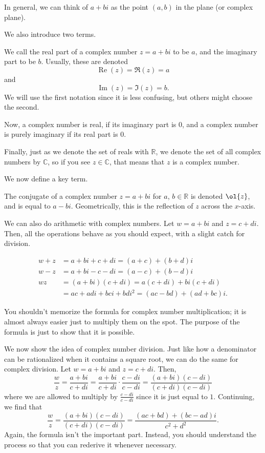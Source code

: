 \documentclass[11pt]{scrartcl}
\begin{document}
In general, we can think of $a+bi$ as the point $(a,b)$ in the plane (or complex plane).

We also introduce two terms.

\begin{definition*}
We call the real part of a complex number $z = a+bi$ to be $a$, and the imaginary part to be $b$. Usually, these are denoted \[\operatorname{Re}(z) = \Re(z) = a\] and \[\operatorname{Im}(z) = \Im(z) = b.\] We will use the first notation since it is less confusing, but others might choose the second.
\end{definition*}

Now, a complex number is real, if its imaginary part is $0$, and a complex number is purely imaginary if its real part is $0$.

Finally, just as we denote the set of reals with $\mathbb{R}$, we denote the set of all complex numbers by $\mathbb{C}$, so if you see $z \in \mathbb{C}$, that means that $z$ is a complex number.

We now define a key term.

\begin{definition*}
The conjugate of a complex number $z = a+bi$ for $a$, $b \in \mathbb{R}$ is denoted $\ol{z}$, and is equal to $a-bi$. Geometrically, this is the reflection of $z$ across the $x$-axis.
\end{definition*}

We can also do arithmetic with complex numbers. Let $w = a+bi$ and $z = c+di$. Then, all the operations behave as you should expect, with a slight catch for division.

\begin{align*}
w+z &= a+bi+c+di = (a+c)+(b+d)i \\
w-z &= a+bi-c-di = (a-c)+(b-d)i \\
wz &= (a+bi)(c+di) = a(c+di)+bi(c+di) \\
&= ac+adi+bci+bdi^2 = (ac-bd) +(ad+bc) i.
\end{align*}

You shouldn't memorize the formula for complex number multiplication; it is almost always easier just to multiply them on the spot. The purpose of the formula is just to show that it is possible.

We now show the idea of complex number division. Just like how a denominator can be rationalized when it contains a square root, we can do the same for complex division. Let $w = a+bi$ and $z = c+di$. Then, \[\dfrac{w}{z} = \dfrac{a+bi}{c+di} = \dfrac{a+bi}{c+di}\cdot \dfrac{c-di}{c-di} = \dfrac{(a+bi)(c-di)}{(c+di)(c-di)}\] where we are allowed to multiply by $\tfrac{c-di}{c-di}$ since it is just equal to $1$. Continuing, we find that \[\dfrac{w}{z} = \dfrac{(a+bi)(c-di)}{(c+di)(c-di)} = \dfrac{(ac+bd)+(bc-ad)i}{c^2+d^2}.\] Again, the formula isn't the important part. Instead, you should understand the process so that you can rederive it whenever necessary.
\end{document}
